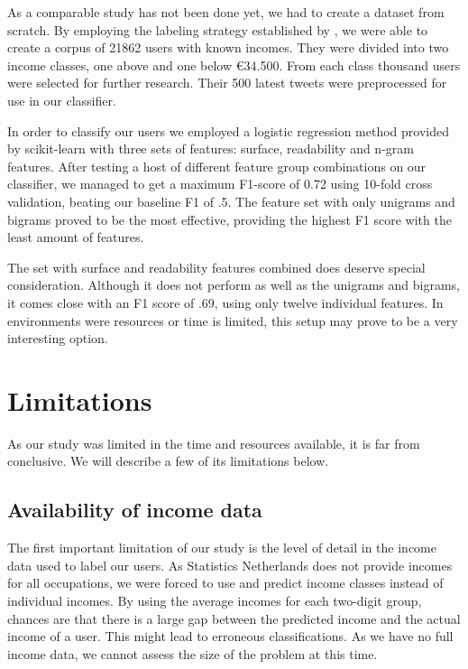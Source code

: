 \documentclass[
10pt, %
a4paper, %
oneside, %
headinclude,footinclude, %
] {book}%
\begin{document}
As a comparable study has not been done yet, we had to create a dataset from scratch. By employing the labeling strategy established by \citet{sloan}, we were able to create a corpus of 21862 users with known incomes. They were divided into two income classes, one above and one below \euro 34.500. From each class thousand users were selected for further research. Their 500 latest tweets were preprocessed for use in our classifier.

In order to classify our users we employed a logistic regression method provided by scikit-learn \citep{sklearn} with three sets of features: surface, readability and n-gram features. After testing a host of different feature group combinations on our classifier, we managed to get a maximum F1-score of 0.72 using 10-fold cross validation, beating our baseline F1 of .5. The feature set with only unigrams and bigrams proved to be the most effective, providing the highest F1 score with the least amount of features.

The set with surface and readability features combined does deserve special consideration. Although it does not perform as well as the unigrams and bigrams, it comes close with an F1 score of .69, using only twelve individual features. In environments were resources or time is limited, this setup may prove to be a very interesting option.

\section{Limitations}
As our study was limited in the time and resources available, it is far from conclusive. We will describe a few of its limitations below.

\subsection{Availability of income data}
The first important limitation of our study is the level of detail in the income data used to label our users. As Statistics Netherlands does not provide incomes for all occupations, we were forced to use and predict income classes instead of individual incomes. By using the average incomes for each two-digit group, chances are that there is a large gap between the predicted income and the actual income of a user. This might lead to erroneous classifications. As we have no full income data, we cannot assess the size of the problem at this time.
\end{document}

